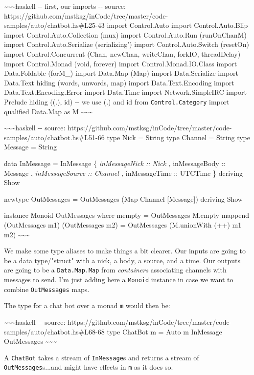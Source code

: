 \documentclass[]{article}
\begin{document}
\textasciitilde{}\textasciitilde{}\textasciitilde{}haskell -\/- first, our
imports -\/- source:
https://github.com/mstksg/inCode/tree/master/code-samples/auto/chatbot.hs\#L25-43
import Control.Auto import Control.Auto.Blip import Control.Auto.Collection
(mux) import Control.Auto.Run (runOnChanM) import Control.Auto.Serialize
(serializing') import Control.Auto.Switch (resetOn) import Control.Concurrent
(Chan, newChan, writeChan, forkIO, threadDelay) import Control.Monad (void,
forever) import Control.Monad.IO.Class import Data.Foldable (forM\_) import
Data.Map (Map) import Data.Serialize import Data.Text hiding (words, unwords,
map) import Data.Text.Encoding import Data.Text.Encoding.Error import Data.Time
import Network.SimpleIRC import Prelude hiding ((.), id) -\/- we use (.) and id
from \texttt{Control.Category} import qualified Data.Map as M
\textasciitilde{}\textasciitilde{}\textasciitilde{}

\textasciitilde{}\textasciitilde{}\textasciitilde{}haskell -\/- source:
https://github.com/mstksg/inCode/tree/master/code-samples/auto/chatbot.hs\#L51-66
type Nick = String type Channel = String type Message = String

data InMessage = InMessage \{ \emph{inMessageNick :: Nick , }inMessageBody ::
Message , \emph{inMessageSource :: Channel , }inMessageTime :: UTCTime \}
deriving Show

newtype OutMessages = OutMessages (Map Channel {[}Message{]}) deriving Show

instance Monoid OutMessages where mempty = OutMessages M.empty mappend
(OutMessages m1) (OutMessages m2) = OutMessages (M.unionWith (++) m1 m2)
\textasciitilde{}\textasciitilde{}\textasciitilde{}

We make some type aliases to make things a bit clearer. Our inputs are going to
be a data type/"struct" with a nick, a body, a source, and a time. Our outputs
are going to be a \texttt{Data.Map.Map} from \emph{containers} associating
channels with messages to send. I'm just adding here a \texttt{Monoid} instance
in case we want to combine \texttt{OutMessages} maps.

The type for a chat bot over a monad \texttt{m} would then be:

\textasciitilde{}\textasciitilde{}\textasciitilde{}haskell -\/- source:
https://github.com/mstksg/inCode/tree/master/code-samples/auto/chatbot.hs\#L68-68
type ChatBot m = Auto m InMessage OutMessages
\textasciitilde{}\textasciitilde{}\textasciitilde{}

A \texttt{ChatBot} takes a stream of \texttt{InMessage}s and returns a stream of
\texttt{OutMessages}s...and might have effects in \texttt{m} as it does so.
\end{document}
